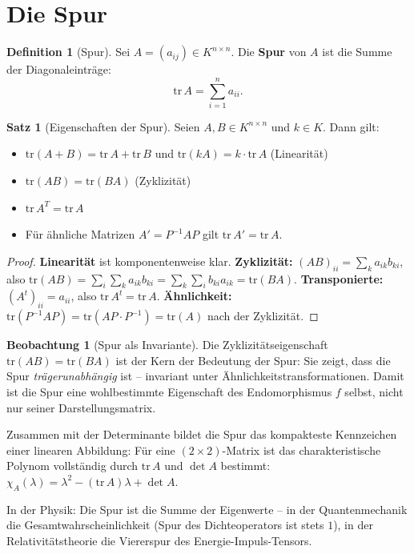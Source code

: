 ﻿\documentclass[a4paper,12pt]{report}
\theoremstyle{definition}
\newtheorem{definition}{Definition}
\newtheorem{satz}{Satz}
\newtheorem{beobachtung}{Beobachtung}
\begin{document}
\section{Die Spur}

\begin{definition}[Spur]
    Sei $A = (a_{ij}) \in K^{n \times n}$. Die \textbf{Spur} von $A$ ist
    die Summe der Diagonaleinträge:
    \[
        \mathrm{tr}\, A = \sum_{i=1}^n a_{ii}.
    \]
\end{definition}

\begin{satz}[Eigenschaften der Spur]
    Seien $A, B \in K^{n \times n}$ und $k \in K$. Dann gilt:
    \begin{itemize}
        \item[-] $\mathrm{tr}(A + B) = \mathrm{tr}\, A + \mathrm{tr}\, B$
              und $\mathrm{tr}(kA) = k \cdot \mathrm{tr}\, A$
              \quad (Linearität)
        \item[-] $\mathrm{tr}(AB) = \mathrm{tr}(BA)$
              \quad (Zyklizität)
        \item[-] $\mathrm{tr}\, A^T = \mathrm{tr}\, A$
        \item[-] Für ähnliche Matrizen $A' = P^{-1}AP$ gilt
              $\mathrm{tr}\, A' = \mathrm{tr}\, A$.
    \end{itemize}
\end{satz}
\begin{proof}
    \textbf{Linearität} ist komponentenweise klar.
    \textbf{Zyklizität:} $(AB)_{ii} = \sum_k a_{ik} b_{ki}$, also
    $\mathrm{tr}(AB) = \sum_i \sum_k a_{ik} b_{ki} = \sum_k \sum_i b_{ki} a_{ik}
    = \mathrm{tr}(BA)$.
    \textbf{Transponierte:} $(A^t)_{ii} = a_{ii}$, also $\mathrm{tr}\, A^t = \mathrm{tr}\, A$.
    \textbf{Ähnlichkeit:} $\mathrm{tr}(P^{-1}AP) = \mathrm{tr}(AP \cdot P^{-1})
    = \mathrm{tr}(A)$ nach der Zyklizität.
\end{proof}


\begin{beobachtung}[Spur als Invariante]
    Die Zyklizitätseigenschaft $\mathrm{tr}(AB) = \mathrm{tr}(BA)$ ist
    der Kern der Bedeutung der Spur: Sie zeigt, dass die Spur
    \emph{trägerunabhängig} ist -- invariant unter Ähnlichkeitstransformationen.
    Damit ist die Spur eine wohlbestimmte Eigenschaft des Endomorphismus
    $f$ selbst, nicht nur seiner Darstellungsmatrix.

    Zusammen mit der Determinante bildet die Spur das kompakteste
    Kennzeichen einer linearen Abbildung: Für eine $(2 \times 2)$-Matrix ist
    das charakteristische Polynom vollständig durch $\mathrm{tr}\, A$ und
    $\det A$ bestimmt:
    $\chi_A(\lambda) = \lambda^2 - (\mathrm{tr}\, A)\lambda + \det A$.

    In der Physik: Die Spur ist die Summe der Eigenwerte -- in der
    Quantenmechanik die Gesamtwahrscheinlichkeit (Spur des Dichteoperators
    ist stets $1$), in der Relativitätstheorie die Viererspur des
    Energie-Impuls-Tensors.
\end{beobachtung}
\end{document}
